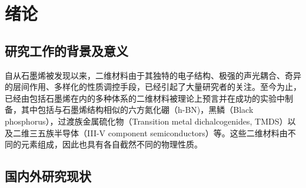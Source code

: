 \chapter{绪\hspace{6pt}论}

\section{研究工作的背景及意义}
自从石墨烯被发现以来，二维材料由于其独特的电子结构、极强的声光耦合、奇异的层间作用、多样化的性质调控手段，已经引起了大量研究者的关注。至今为止，已经由包括石墨烯在内的多种体系的二维材料被理论上预言并在成功的实验中制备，其中包括与石墨烯结构相似的六方氮化硼（h-BN)，黑鳞（Black phosphorus），过渡族金属硫化物（Transition metal dichalcogenides, TMDS）以及二维三五族半导体（III-V component semiconductors）等。这些二维材料由不同的元素组成，因此也具有各自截然不同的物理性质。 


\section{国内外研究现状}